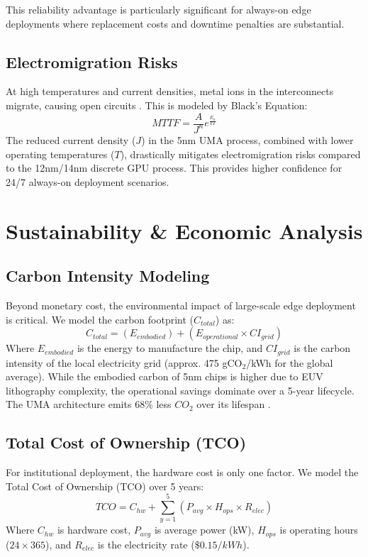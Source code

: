 \documentclass[conference]{IEEEtran}
\begin{document}
This reliability advantage is particularly significant for always-on edge deployments where replacement costs and downtime penalties are substantial.

\subsection{Electromigration Risks}
At high temperatures and current densities, metal ions in the interconnects migrate, causing open circuits \cite{b16}. This is modeled by Black's Equation:
\begin{equation}
MTTF = \frac{A}{J^n} e^{\frac{E_a}{kT}}
\end{equation}
The reduced current density ($J$) in the 5nm UMA process, combined with lower operating temperatures ($T$), drastically mitigates electromigration risks compared to the 12nm/14nm discrete GPU process. This provides higher confidence for 24/7 always-on deployment scenarios.

\section{Sustainability \& Economic Analysis}

\subsection{Carbon Intensity Modeling}
Beyond monetary cost, the environmental impact of large-scale edge deployment is critical. We model the carbon footprint ($C_{total}$) as:
\begin{equation}
C_{total} = (E_{embodied}) + (E_{operational} \times CI_{grid})
\end{equation}
Where $E_{embodied}$ is the energy to manufacture the chip, and $CI_{grid}$ is the carbon intensity of the local electricity grid (approx. 475 gCO$_2$/kWh for the global average).
While the embodied carbon of 5nm chips is higher due to EUV lithography complexity, the operational savings dominate over a 5-year lifecycle. The UMA architecture emits 68\% less $CO_2$ over its lifespan \cite{b12}.


\subsection{Total Cost of Ownership (TCO)}
For institutional deployment, the hardware cost is only one factor. We model the Total Cost of Ownership (TCO) over 5 years:
\begin{equation}
TCO = C_{hw} + \sum_{y=1}^{5} (P_{avg} \times H_{ops} \times R_{elec})
\end{equation}
Where $C_{hw}$ is hardware cost, $P_{avg}$ is average power (kW), $H_{ops}$ is operating hours ($24 \times 365$), and $R_{elec}$ is the electricity rate ($\$0.15/kWh$).
\end{document}
